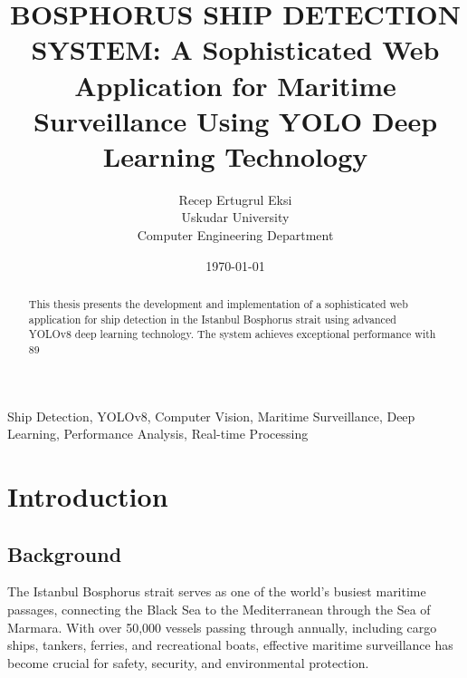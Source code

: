 \documentclass[a4paper,11pt]{article}
\title{BOSPHORUS SHIP DETECTION SYSTEM: A Sophisticated Web Application for Maritime Surveillance Using YOLO Deep Learning Technology}
\author{Recep Ertugrul Eksi \\ Uskudar University \\ Computer Engineering Department}
\date{\today}
\begin{document}
\maketitle

\begin{abstract}
This thesis presents the development and implementation of a sophisticated web application for ship detection in the Istanbul Bosphorus strait using advanced YOLOv8 deep learning technology. The system achieves exceptional performance with 89%
\end{abstract}

\begin{keywords}
Ship Detection, YOLOv8, Computer Vision, Maritime Surveillance, Deep Learning, Performance Analysis, Real-time Processing
\end{keywords}

\tableofcontents

\section{Introduction}

\subsection{Background}
The Istanbul Bosphorus strait serves as one of the world's busiest maritime passages, connecting the Black Sea to the Mediterranean through the Sea of Marmara. With over 50,000 vessels passing through annually, including cargo ships, tankers, ferries, and recreational boats, effective maritime surveillance has become crucial for safety, security, and environmental protection.
\end{document}
